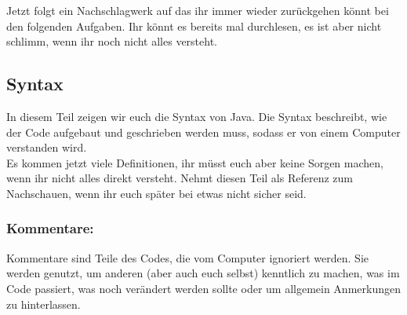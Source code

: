 
Jetzt folgt ein Nachschlagwerk auf das ihr immer wieder zurückgehen könnt bei den folgenden Aufgaben.
Ihr könnt es bereits mal durchlesen, es ist aber nicht schlimm, wenn ihr noch nicht alles versteht.

\subsection*{Syntax}
\noindent
In diesem Teil zeigen wir euch die Syntax von Java.
Die Syntax beschreibt, wie der Code aufgebaut und geschrieben werden muss, sodass er von einem Computer verstanden wird.\\
Es kommen jetzt viele Definitionen, ihr müsst euch aber keine Sorgen machen, wenn ihr nicht alles direkt versteht.
Nehmt diesen Teil als Referenz zum Nachschauen, wenn ihr euch später bei etwas nicht sicher seid.

\begin{Infobox}

	\subsubsection*{Kommentare:}
	Kommentare sind Teile des Codes, die vom Computer ignoriert werden.
	Sie werden genutzt, um anderen (aber auch euch selbst) kenntlich zu machen, was im Code passiert, was noch verändert werden sollte oder um allgemein Anmerkungen zu hinterlassen.
\end{Infobox}

